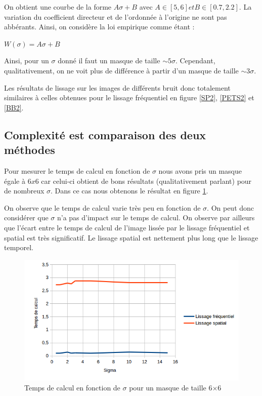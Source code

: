 \documentclass[paper=a4, fontsize=11pt]{scrartcl} %
\begin{document}
On obtient une courbe de la forme $A\sigma + B$ avec $A \in [5,6] et B\in[0.7,2.2]$. La variation du coefficient directeur et de l'ordonnée à l'origine ne sont pas abbérants.
Ainsi, on considère la loi empirique comme étant : 
\begin{center}
$W(\sigma) = A\sigma+B$
\end{center}

Ainsi, pour un $\sigma$ donné il faut un masque de taille $\sim 5\sigma$. Cependant, qualitativement, on ne voit plus de différence à partir d'un masque de taille $\sim 3\sigma$. 

Les résultats de lissage sur les images de différents bruit donc totalement similaires à celles obtenues pour le lissage fréquentiel en figure \ref{SP2}, \ref{PETS2} et \ref{BB2}.
\subsection{Complexité est comparaison des deux méthodes}
Pour mesurer le temps de calcul en fonction de $\sigma$ nous avons pris un masque égale à $6x6$ car celui-ci obtient de bons résultats (qualitativement parlant) pour de nombreux $\sigma$. Dans ce cas nous obtenons le résultat en figure \ref{tempscalculsigma}.

On observe que le temps de calcul varie très peu en fonction de $\sigma$. On peut donc considérer que $\sigma$ n'a pas d'impact sur le temps de calcul. On observe par ailleurs que l'écart entre le temps de calcul de l'image lissée par le lissage fréquentiel et spatial est très significatif. Le lissage spatial est nettement plus long que le lissage temporel.


\begin{figure}
\centering
\caption{Temps de calcul en fonction de $\sigma$ pour un masque de taille 6$\times$6}
\label{tempscalculsigma}
\includegraphics[scale=1]{images/rapport/courbes/temps_calcul_sigma.png} 
\end{figure}
\end{document}

